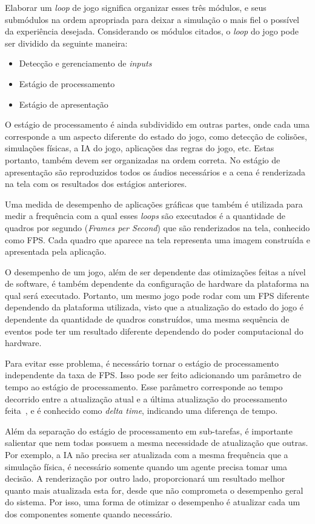 Elaborar um \textit{loop} de jogo significa organizar esses três módulos, e seus submódulos na 
ordem apropriada para deixar a simulação o mais fiel o possível da experiência desejada. 
Considerando os módulos citados, o \textit{loop} do jogo pode ser dividido da seguinte 
maneira:
\begin{itemize}
    \item Detecção e gerenciamento de \textit{inputs}
    \item Estágio de processamento
    \item Estágio de apresentação
\end{itemize}

O estágio de processamento é ainda subdividido em outras partes, onde cada uma 
corresponde a um aspecto diferente do estado do jogo, como detecção de colisões, 
simulações físicas, a IA do jogo, aplicações das regras do jogo, etc. Estas portanto, 
também devem ser organizadas na ordem correta. No estágio de apresentação são 
reproduzidos todos os áudios necessários e a cena é renderizada na tela com os 
resultados dos estágios anteriores.

Uma medida de desempenho de aplicações gráficas que também é utilizada para medir a 
frequência com a qual esses \textit{loops} são executados é a quantidade de quadros por 
segundo (\textit{Frames per Second}) que são renderizados na tela, conhecido como 
FPS. Cada quadro que aparece na tela representa uma imagem construída e apresentada 
pela aplicação.

O desempenho de um jogo, além de ser dependente das otimizações feitas a nível de 
software, é também dependente da configuração de hardware da plataforma na qual será 
executado. Portanto, um mesmo jogo pode rodar com um FPS diferente dependendo da 
plataforma utilizada, visto que a atualização do estado do jogo é dependente da 
quantidade de quadros construídos, uma mesma sequência de eventos pode ter um 
resultado diferente dependendo do poder computacional do hardware. 

Para evitar esse problema, é necessário tornar o estágio de processamento independente 
da taxa de FPS. Isso pode ser feito adicionando um parâmetro de tempo ao estágio de 
processamento. Esse parâmetro corresponde ao tempo decorrido entre a atualização 
atual e a última atualização do processamento feita~\cite{valente2005real}, e é 
conhecido como \textit{delta time}, indicando uma diferença de tempo.

Além da separação do estágio de processamento em sub-tarefas, é importante salientar 
que nem todas possuem a mesma necessidade de atualização que outras. Por exemplo, a IA 
não precisa ser atualizada com a mesma frequência que a simulação física, 
é necessário somente quando um agente precisa tomar uma decisão. A renderização por 
outro lado, proporcionará um resultado melhor quanto mais atualizada esta for, desde 
que não comprometa o desempenho geral do sistema. Por isso, uma forma de otimizar o 
desempenho é atualizar cada um dos componentes somente quando necessário.

